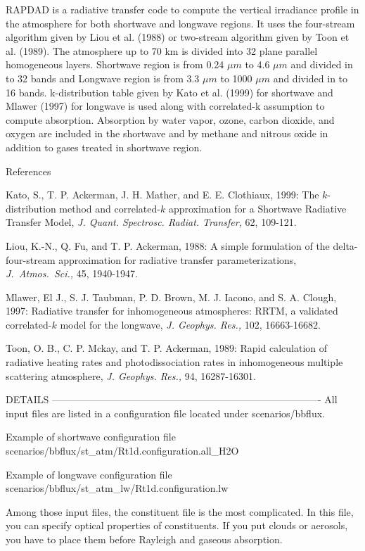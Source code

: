 RAPDAD is a radiative transfer code to compute the vertical irradiance profile in the atmosphere for both shortwave and longwave regions.
It uses the four-stream algorithm given by Liou et al. (1988) or two-stream algorithm given by Toon et al. (1989).
The atmosphere up to 70 km is divided into 32 plane parallel homogeneous layers.
Shortwave region is from 0.24 $\mu m$ to 4.6 $\mu m$ and divided in to 32 bands and Longwave region is from 3.3 $\mu m$ to 1000 $\mu m$ and divided in to 16 bands.
k-distribution table given by Kato et al. (1999) for shortwave and Mlawer (1997) for longwave is used along with correlated-k assumption to compute absorption.
Absorption by water vapor, ozone, carbon dioxide, and oxygen are included in the shortwave and by methane and nitrous oxide in addition to gases treated in shortwave region.

References

Kato, S., T. P. Ackerman, J. H. Mather, and E. E. Clothiaux, 1999: The $k$-distribution method and correlated-$k$ approximation for a Shortwave Radiative Transfer Model, {\it J. Quant. Spectrosc. Radiat. Transfer,} 62, 109-121.

Liou, K.-N., Q. Fu, and T. P. Ackerman, 1988:
A simple formulation of the delta-four-stream approximation for radiative transfer parameterizations, {\it J.\ Atmos.\ Sci.,} 45, 1940-1947.

Mlawer, El J., S. J. Taubman, P. D. Brown, M. J. Iacono, and S. A. Clough, 1997:
Radiative transfer for inhomogeneous atmospheres: RRTM, a validated correlated-$k$ model for the longwave, {\it J. Geophys. Res.,} 102, 16663-16682. 

Toon, O. B., C. P. Mckay, and T. P. Ackerman, 1989:
Rapid calculation of radiative heating rates and photodissociation rates in inhomogeneous multiple scattering atmosphere, {\it J. Geophys. Res.,} 94, 16287-16301.

DETAILS ----------------------------------------------------------------------------------
All input files are listed in a configuration file located under scenarios/bbflux.

Example of shortwave configuration file
scenarios/bbflux/st_atm/Rt1d.configuration.all_H2O

Example of longwave configuration file
scenarios/bbflux/st_atm_lw/Rt1d.configuration.lw

Among those input files, the constituent file is the most complicated.
In this file, you can specify optical properties of constituents.
If you put clouds or aerosols, you have to place them before Rayleigh and gaseous absorption.

